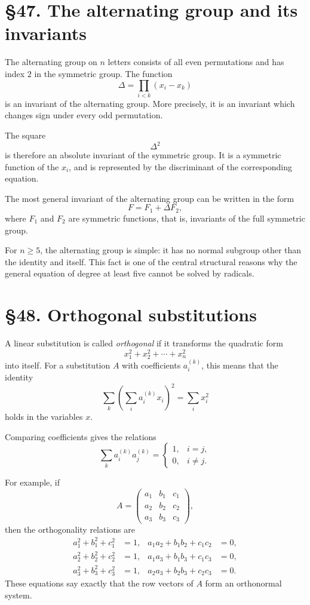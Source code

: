 \documentclass[11pt,a4paper]{book}
\newcommand{\webersection}[2]{\clearpage\section*{\S #1. #2}}
\begin{document}
\webersection{47}{The alternating group and its invariants}

The alternating group on \(n\) letters consists of all even permutations and has index \(2\) in the symmetric group.  The function
\begin{equation}
\Delta=\prod_{i<k}(x_i-x_k)
\end{equation}
is an invariant of the alternating group.  More precisely, it is an invariant which changes sign under every odd permutation.

The square
\[
\Delta^2
\]
is therefore an absolute invariant of the symmetric group.  It is a symmetric function of the \(x_i\), and is represented by the discriminant of the corresponding equation.

The most general invariant of the alternating group can be written in the form
\begin{equation}
F=F_1+\Delta F_2,
\end{equation}
where \(F_1\) and \(F_2\) are symmetric functions, that is, invariants of the full symmetric group.

For \(n\geq 5\), the alternating group is simple: it has no normal subgroup other than the identity and itself.  This fact is one of the central structural reasons why the general equation of degree at least five cannot be solved by radicals.

\webersection{48}{Orthogonal substitutions}

A linear substitution is called \emph{orthogonal} if it transforms the quadratic form
\begin{equation}
x_1^2+x_2^2+\cdots+x_n^2
\end{equation}
into itself.  For a substitution \(A\) with coefficients \(a_i^{(k)}\), this means that the identity
\begin{equation}
\sum_k\left(\sum_i a_i^{(k)}x_i\right)^2=\sum_i x_i^2
\end{equation}
holds in the variables \(x\).

Comparing coefficients gives the relations
\begin{equation}
\sum_k a_i^{(k)}a_j^{(k)}
=
\begin{cases}
1,& i=j,\\
0,& i\neq j.
\end{cases}
\end{equation}

For example, if
\[
A=
\begin{pmatrix}
a_1&b_1&c_1\\
a_2&b_2&c_2\\
a_3&b_3&c_3
\end{pmatrix},
\]
then the orthogonality relations are
\begin{align}
a_1^2+b_1^2+c_1^2&=1,&
a_1a_2+b_1b_2+c_1c_2&=0,\\
a_2^2+b_2^2+c_2^2&=1,&
a_1a_3+b_1b_3+c_1c_3&=0,\\
a_3^2+b_3^2+c_3^2&=1,&
a_2a_3+b_2b_3+c_2c_3&=0.
\end{align}
These equations say exactly that the row vectors of \(A\) form an orthonormal system.
\end{document}

